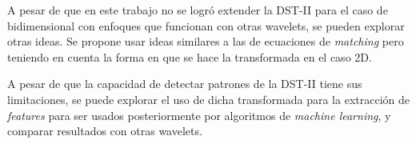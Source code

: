 \begin{recomendations}
	A pesar de que en este trabajo no se logró extender la DST-II para el caso de bidimensional con enfoques 
	que funcionan con otras wavelets, se pueden explorar otras ideas.
	Se propone usar ideas similares a las de ecuaciones de \textit{matching} pero teniendo
	en cuenta la forma en que se hace la transformada en el caso 2D.

	A pesar de que la capacidad de detectar patrones de la DST-II tiene sus limitaciones, se puede explorar el uso
	de dicha transformada para la extracción de \textit{features} para ser usados posteriormente por algoritmos
	de \textit{machine learning}, y comparar resultados con otras wavelets.
\end{recomendations}
